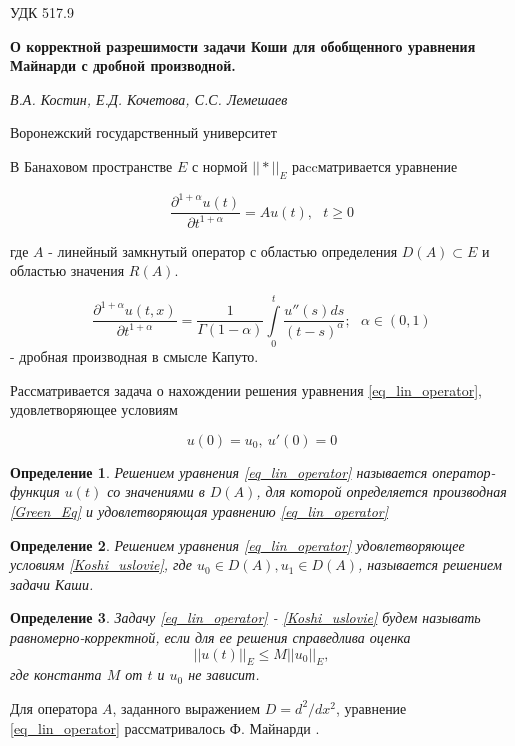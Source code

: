 \documentclass[12pt,openbib]{article}
\newtheorem{definition}{Определение}
\begin{document}
УДК 517.9

\large
\begin{center}
    {\Large\bf О корректной разрешимости задачи Коши для обобщенного уравнения Майнарди с дробной производной.}
    \vspace{3mm}

    {\em В.А. Костин, Е.Д. Кочетова, С.С. Лемешаев  }
    \vspace{3mm}

    Воронежский государственный университет
\end{center}


В Банаховом пространстве $E$ с нормой $||*||_E$ раccматривается уравнение

\begin{equation}\label{eq_lin_operator}
	\frac{\partial^{1+\alpha} u(t)}{\partial t^{1+\alpha}} = Au(t), \ \ \ t \geqslant 0
\end{equation}

где $A$  - линейный замкнутый оператор с областью определения $D(A) \subset E$ и областью значения $R(A)$.

\begin{equation}\label{Green_Eq}
        \frac{\partial^{1+\alpha}u(t,x)}{\partial t^{1+\alpha}} = \frac{1}{\Gamma(1-\alpha)} \int\limits_0^t \frac{u''(s)ds}{(t - s)^{\alpha}}; \ \ \ \alpha \in (0, 1)
\end{equation}
 - дробная производная в смысле Капуто.
\vspace{3mm}


Рассматривается задача о нахождении решения уравнения \ref{eq_lin_operator}, удовлетворяющее условиям

\begin{equation}\label{Koshi_uslovie}
	u(0) = u_0, \ u'(0) = 0
\end{equation}

\begin{definition}
	Решением уравнения \ref{eq_lin_operator} называется оператор-функция $u(t)$ со значениями в $D(A)$, для которой определяется производная \ref{Green_Eq} и удовлетворяющая уравнению \ref{eq_lin_operator}
\end{definition}

\begin{definition}
	Решением уравнения \ref{eq_lin_operator} удовлетворяющее условиям \ref{Koshi_uslovie}, где $u_0 \in D(A), u_1 \in D(A)$, называется решением задачи Каши.
\end{definition}

\begin{definition}
	Задачу \ref{eq_lin_operator} - \ref{Koshi_uslovie} будем называть равномерно-корректной, если для ее решения справедлива оценка
	\begin{equation}\label{ocenka}
		||u(t)||_E \leq M||u_0||_E,
	\end{equation}
	где константа $M$ от $t$ и $u_0$ не зависит.
\end{definition}
Для оператора $A$, заданного выражением $D=d^2/dx^2$, уравнение \ref{eq_lin_operator} рассматривалось Ф. Майнарди \cite{Mainardi}.
\vspace{3mm}
\end{document}
